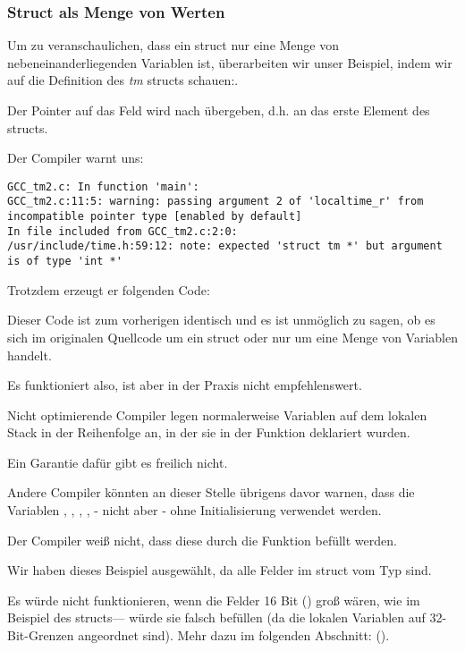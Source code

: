 \subsubsection{Struct als Menge von Werten}
Um zu veranschaulichen, dass ein struct nur eine Menge von nebeneinanderliegenden Variablen ist, überarbeiten wir unser
Beispiel, indem wir auf die Definition des \emph{tm} structs schauen:.



Der Pointer auf das Feld  wird nach  übergeben, d.h. an das erste Element des structs.

Der Compiler warnt uns:

\begin{lstlisting}[caption=GCC 4.7.3]
GCC_tm2.c: In function 'main':
GCC_tm2.c:11:5: warning: passing argument 2 of 'localtime_r' from incompatible pointer type [enabled by default]
In file included from GCC_tm2.c:2:0:
/usr/include/time.h:59:12: note: expected 'struct tm *' but argument is of type 'int *'
\end{lstlisting}

Trotzdem erzeugt er folgenden Code:


Dieser Code ist zum vorherigen identisch und es ist unmöglich zu sagen, ob es sich im originalen Quellcode um ein struct
oder nur um eine Menge von Variablen handelt.

Es funktioniert also, ist aber in der Praxis nicht empfehlenswert. 

Nicht optimierende Compiler legen normalerweise Variablen auf dem lokalen Stack in der Reihenfolge an, in der sie in der
Funktion deklariert wurden.

Ein Garantie dafür gibt es freilich nicht.

Andere Compiler könnten an dieser Stelle übrigens davor warnen, dass die Variablen , , ,
,  - nicht aber  - ohne Initialisierung verwendet werden.

Der Compiler weiß nicht, dass diese durch die Funktion  befüllt werden.

Wir haben dieses Beispiel ausgewählt, da alle Felder im struct vom Typ \Tint sind.

Es würde nicht funktionieren, wenn die Felder 16 Bit () groß wären, wie im Beispiel des 
structs--- würde sie falsch befüllen (da die lokalen Variablen auf 32-Bit-Grenzen angeordnet sind).
Mehr dazu im folgenden Abschnitt: \q{\StructurePackingSectionName} ().

